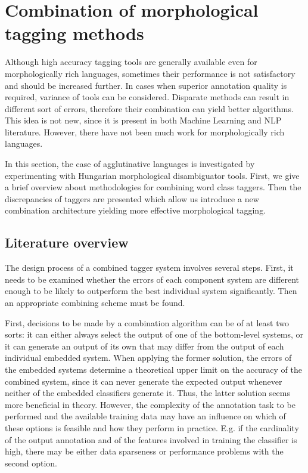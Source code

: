 \section{Combination of morphological tagging methods}

Although high accuracy tagging tools are generally available even for morphologically rich languages, sometimes their performance is not satisfactory and should be increased further. 
In cases when superior annotation quality is required, variance of tools can be considered.
Disparate methods can result in different sort of errors, therefore their combination can yield better algorithms. This idea is not new, since it is present in both Machine Learning and NLP literature. However, there have not been much work for morphologically rich languages. 

In this section, the case of agglutinative languages is investigated by experimenting with Hungarian morphological disambiguator tools. First, we give a brief overview about methodologies for combining word class taggers. Then the discrepancies of taggers are presented which allow us introduce a new combination architecture yielding more effective morphological tagging. 

\subsection{Literature overview}

The design process of a combined tagger system involves several steps. 
First, it needs to be examined whether the errors of each component system are different enough to be likely to outperform the best individual system significantly. 
Then an appropriate combining scheme must be found. 

First, decisions to be made by a combination algorithm can be of at least two sorts: it can either always select the output of one of the bottom-level systems, or it can generate an output of its own that may differ from the output of each individual embedded system. 
When applying the former solution, the errors of the embedded systems determine a theoretical upper limit on the accuracy of the combined system, since it can never generate the expected output whenever neither of the embedded classifiers generate it. Thus, the latter solution seems more beneficial in theory. However, the complexity of the annotation task to be performed and the available training data may have an influence on which of these options is feasible and how they perform in practice. E.g. if the cardinality of the output annotation and of the features involved in training the classifier is high, there may be either data sparseness or performance problems with the second option.

